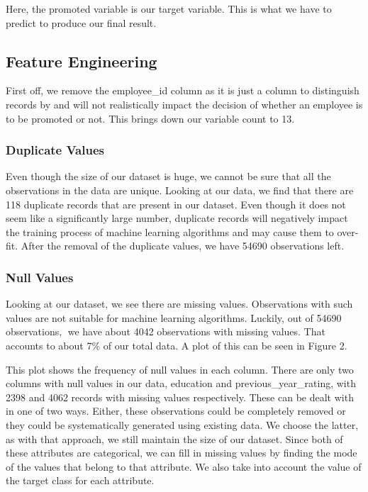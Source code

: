 \documentclass[
]{article}
\begin{document}
Here, the promoted variable is our target variable. This is what we have
to predict to produce our final result.

\hypertarget{feature-engineering}{%
\subsection{Feature Engineering}\label{feature-engineering}}

First off, we remove the employee\_id column as it is just a column to
distinguish records by and will not realistically impact the decision of
whether an employee is to be promoted or not. This brings down our
variable count to 13.

\hypertarget{duplicate-values}{%
\subsubsection{Duplicate Values}\label{duplicate-values}}

Even though the size of our dataset is huge, we cannot be sure that all
the observations in the data are unique. Looking at our data, we find
that there are 118 duplicate records that are present in our dataset.
Even though it does not seem like a significantly large number,
duplicate records will negatively impact the training process of machine
learning algorithms and may cause them to over-fit. After the removal of
the duplicate values, we have 54690 observations left.

\hypertarget{null-values}{%
\subsubsection{Null Values}\label{null-values}}

Looking at our dataset, we see there are missing values. Observations
with such values are not suitable for machine learning algorithms.
Luckily, out of 54690 observations, we have about 4042 observations
with missing values. That accounts to about 7\% of our total data. A
plot of this can be seen in Figure 2.

This plot shows the frequency of null values in each column. There are
only two columns with null values in our data, education and
previous\_year\_rating, with 2398 and 4062 records with missing values
respectively. These can be dealt with in one of two ways. Either, these
observations could be completely removed or they could be systematically
generated using existing data. We choose the latter, as with that
approach, we still maintain the size of our dataset. Since both of these
attributes are categorical, we can fill in missing values by finding the
mode of the values that belong to that attribute. We also take into
account the value of the target class for each attribute.
\end{document}
